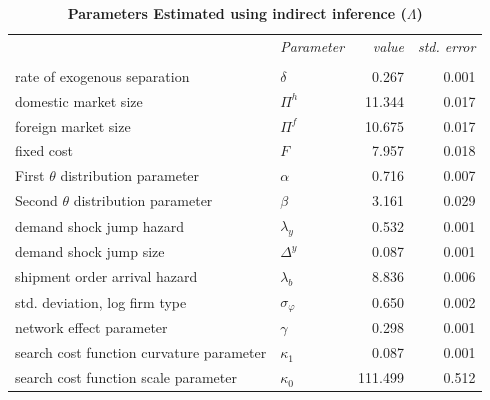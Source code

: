 \begin{table}
    \centering
    {\small 
    \begin{tabular}{llrr} \hline \hline 
        & \textit{Parameter}   & \textit{value} & \textit{std. error} \\ \cline{2-4} \\
        rate of exogenous separation                                 & $\delta $            & 0.267          & 0.001               \\
        domestic market size                                         & $\Pi ^{h}$           & 11.344         & 0.017               \\
        foreign market size                                          & $\Pi ^{f}$           & 10.675         & 0.017               \\
        fixed cost                                                   & $F$                  & 7.957          & 0.018               \\
        First $\theta $ distribution parameter                       & $\alpha $            & 0.716          & 0.007               \\
        Second $\theta $ distribution parameter                      & $\beta $             & 3.161          & 0.029               \\
        demand shock jump hazard                                     & $\lambda _{y}$       & 0.532          & 0.001               \\
        demand shock jump size                                       & $\Delta ^{y}$        & 0.087          & 0.001               \\
        shipment order arrival hazard                                & $\lambda _{b}$       & 8.836          & 0.006               \\
        std. deviation, log firm type                                & $\sigma _{\varphi }$ & 0.650          & 0.002               \\
        network effect parameter                                     & $\gamma $            & 0.298          & 0.001               \\
        \multicolumn{1}{c}{search cost function curvature parameter} & $\kappa _{1}$        & 0.087          & 0.001               \\
        search cost function scale parameter                         & $\kappa _{0}$        & 111.499        & 0.512               \\
        \hline
    \end{tabular}%
    }
    \caption{\textbf{Parameters Estimated using indirect inference ($\Lambda $)}}
\end{table}

